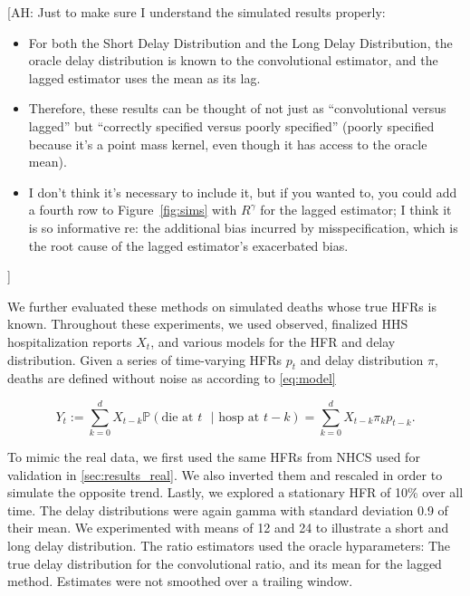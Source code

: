 \documentclass{article}
\newcommand{\ahcomment}[1]{{\color{red}[AH: #1]}}
\begin{document}
\ahcomment{
  Just to make sure I understand the simulated results properly:
  \begin{itemize}
    \item For both the Short Delay Distribution and the Long Delay
      Distribution, the oracle delay distribution is known to the convolutional
      estimator, and the lagged estimator uses the mean as its lag.
    \item Therefore, these results can be thought of not just as
      ``convolutional versus lagged'' but ``correctly specified versus
      poorly specified'' (poorly specified because it's a point mass kernel,
      even though it has access to the oracle mean).
    \item I don't think it's necessary to include it, but if you wanted to,
      you could add a fourth row to Figure~\ref{fig:sims} with $R^\gamma$
      for the lagged estimator;  I think it is so informative re:
      the additional bias incurred by misspecification, which is the root
      cause of the lagged estimator's exacerbated bias.
  \end{itemize}
}

We further evaluated these methods on simulated deaths whose true HFRs is known. Throughout these experiments, we used observed, finalized HHS hospitalization reports $X_t$, and various models for the HFR and delay distribution. Given a series of time-varying HFRs $p_t$ and delay distribution $\pi$, deaths are defined without noise as according to \eqref{eq:model}

$$Y_t := \sum_{k=0}^d X_{t-k} \mathbb{P}(\text{die at $t$ }\vert\text{ hosp at }t-k) = \sum_{k=0}^d X_{t-k} \pi_k p_{t-k}.$$

To mimic the real data, we first used the same HFRs from NHCS used for validation in \ref{sec:results_real}. We also inverted them and rescaled in order to simulate the opposite trend. Lastly, we explored a stationary HFR of 10\% over all time. The delay distributions were again gamma with standard deviation 0.9 of their mean. We experimented with means of 12 and 24 to illustrate a short and long delay distribution. The ratio estimators used the oracle hyparameters: The true delay distribution for the convolutional ratio, and its mean for the lagged method. Estimates were not smoothed over a trailing window.
\end{document}
